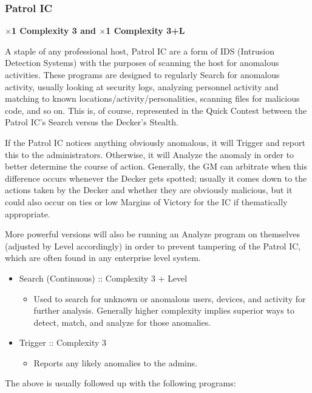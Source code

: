 \begin{multicols}{2}
	\subsubsection{Patrol IC}
	
	\textbf{$\times$1 Complexity 3 and $\times$1 Complexity 3+L}
	
	A staple of any professional host, Patrol IC are a form of IDS (Intrusion Detection Systems) with the purposes of scanning the host for anomalous activities. These programs are designed to regularly Search for anomalous activity, usually looking at security logs, analyzing personnel activity and matching to known locations/activity/personalities, scanning files for malicious code, and so on. This is, of course, represented in the Quick Contest between the Patrol IC's Search versus the Decker's Stealth.
	
	If the Patrol IC notices anything obviously anomalous, it will Trigger and report this to the administrators. Otherwise, it will Analyze the anomaly in order to better determine the course of action. Generally, the GM can arbitrate when this difference occurs whenever the Decker gets spotted; usually it comes down to the actions taken by the Decker and whether they are obviously malicious, but it could also occur on ties or low Margins of Victory for the IC if thematically appropriate.
	
	More powerful versions will also be running an Analyze program on themselves (adjusted by Level accordingly) in order to prevent tampering of the Patrol IC, which are often found in any enterprise level system.
	
	\begin{itemize}
		\itemsep 0pt
		\item Search (Continuous) :: Complexity 3 + Level
		\begin{itemize}
			\itemsep 0pt
			\item Used to search for unknown or anomalous users, devices, and activity for further analysis. Generally higher complexity implies superior ways to detect, match, and analyze for those anomalies.
		\end{itemize}
		\item Trigger :: Complexity 3
		\begin{itemize}
			\itemsep 0pt
			\item Reports any likely anomalies to the admins.
		\end{itemize}
	\end{itemize}

	The above is usually followed up with the following programs:


\end{multicols}
